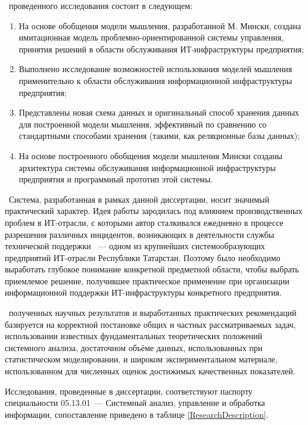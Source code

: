 \novelty\ проведенного исследования состоит в следующем:
\begin{enumerate}
  \item На основе обобщения модели мышления, разработанной М. Мински, создана имитационная модель проблемно-ориентированной системы управления, принятия решений в области обслуживания ИТ-инфраструктуры предприятия;
  \item Выполнено исследование возможностей использования моделей мышления применительно к области обслуживания информационной инфраструктуры предприятия;
  \item Представлены новая схема данных и оригинальный способ хранения данных для построенной модели мышления, эффективный по сравнению со стандартными способами хранения (такими, как реляционные базы данных);
  \item На основе построенного обобщения модели мышления Мински созданы архитектура системы обслуживания информационной инфраструктуры предприятия и программный прототип этой системы.
\end{enumerate}

\influence\ 
Система, разработанная в рамках данной диссертации, носит значимый практический характер. Идея работы зародилась под влиянием производственных проблем в ИТ-отрасли, с которыми автор сталкивался ежедневно в процессе разрешения различных инцидентов, возникающих в деятельности службы технической поддержки \icl~--- одном из крупнейших системообразующих предприятий ИТ-отрасли Республики Татарстан. Поэтому было необходимо выработать глубокое понимание конкретной предметной области, чтобы выбрать приемлемое решение, получившее практическое применение при организации информационной поддержки ИТ-инфраструктуры конкретного предприятия. \par
\reliability\ полученных научных результатов и выработанных практических рекомендаций базируется на корректной постановке общих и частных рассматриваемых задач,  использовании известных фундаментальных теоретических положений системного анализа, достаточном объёме данных, использованных при статистическом моделировании, и широком экспериментальном материале, использованном для численных оценок достижимых качественных показателей. \par 
Исследования, проведенные в диссертации, соответствуют паспорту специальности 05.13.01~--- Системный анализ, управление и обработка информации, сопоставление приведено в таблице \ref{ResearchDescription}.

